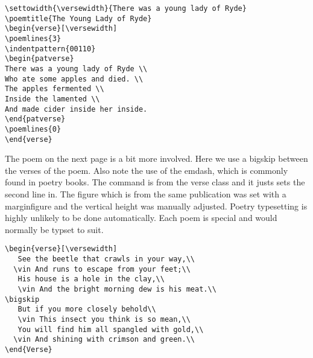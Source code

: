 \begin{lstlisting}[language={[common]TeX},% 
                           alsolanguage={[LaTeX]TeX},% 
                           alsolanguage={[primitive]TeX},%
                           alsolanguage={Verse}]
\settowidth{\versewidth}{There was a young lady of Ryde}
\poemtitle{The Young Lady of Ryde}
\begin{verse}[\versewidth]
\poemlines{3}
\indentpattern{00110}
\begin{patverse}
There was a young lady of Ryde \\
Who ate some apples and died. \\
The apples fermented \\
Inside the lamented \\
And made cider inside her inside.
\end{patverse}
\poemlines{0}
\end{verse}
\end{lstlisting}


The  poem on the next page is a bit more involved. Here we use a bigskip between the verses of the poem. Also note
the use of the emdash, which is commonly found in poetry books. The command  is from the verse class
and it justs sets the second line in. The figure which is from the same publication was set with a marginfigure and the
vertical height was manually adjusted. Poetry typesetting is highly unlikely to be done automatically. Each poem is
special and would normally be typset to suit.

\begin{lstlisting}[language={[common]TeX},% 
                           alsolanguage={[LaTeX]TeX},% 
                           alsolanguage={[primitive]TeX},%
                           alsolanguage={Verse}]
\begin{verse}[\versewidth]
   See the beetle that crawls in your way,\\
  \vin And runs to escape from your feet;\\
   His house is a hole in the clay,\\
   \vin And the bright morning dew is his meat.\\
\bigskip
   But if you more closely behold\\
   \vin This insect you think is so mean,\\
   You will find him all spangled with gold,\\
  \vin And shining with crimson and green.\\
\end{Verse}
\end{lstlisting}

